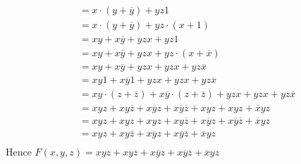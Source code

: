 \documentclass[12pt letter]{report}
\begin{document}
{\begin{enumerate}
\begin{align*}
                                     & = x\cdot \left( y + \overline{y} \right) + yz1 \tag*{Unit Property}                                  \\
                                     & = x \cdot \left( y + \overline{y} \right) + yz \cdot \left( x+ 1 \right) \tag*{First Domination Law} \\
                                     & = xy + x\overline{y} + yzx + yz1 \tag*{Second Distributive Law}                                      \\
                                     & = xy + x\overline{y} + yzx + yz \cdot \left( x + \overline{x} \right) \tag*{Unit
            Property}                                                                                                                       \\
                                     & = xy +x\overline{y} + yzx + yzx + yz\overline{x} \tag*{Second Distributive Law}                      \\
                                     & = xy1 + x\overline{y}1 + yzx + yzx + yz\overline{x} \tag*{Second Identity Law}                       \\
                                     & = xy \cdot \left( z + \overline{z} \right) + x\overline{y} \cdot \left( z +
            \overline{z} \right) + yzx + yzx + yz\overline{x} \tag*{Unit Property}                                                          \\
                                     & = xyz + xy\overline{z} + x\overline{y}z + x\overline{y}\overline{z} + xyz + xyz + \overline{x}yz
            \tag*{Second Distributive Law}                                                                                                  \\
                                     & = xyz + xyz + xyz + xy\overline{z} + x\overline{y}z + x\overline{y}\overline{z} + \overline{x}yz
            \tag*{First Commutative Law}                                                                                                    \\
                                     & = xyz + xy\overline{z}+ x\overline{y}z + x\overline{y}\overline{z} + \overline{x}yz                  \\
          \end{align*}
          Hence $F \left( x, y, z \right) = xyz + xy\overline{z} + x\overline{y}z + x\overline{y}\overline{z} +
            \overline{x}yz $
  \end{enumerate}
}


\sol{

}
\end{document}
